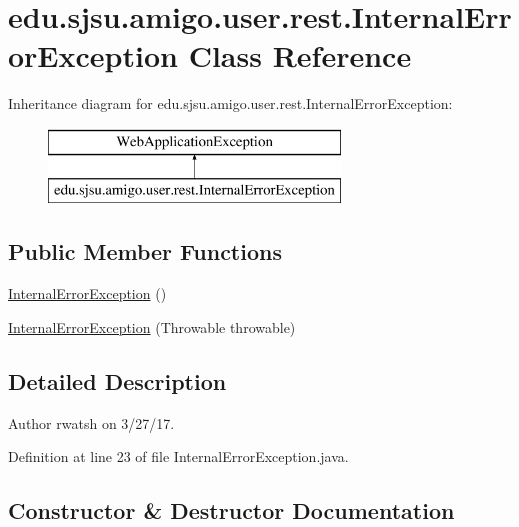 \hypertarget{classedu_1_1sjsu_1_1amigo_1_1user_1_1rest_1_1_internal_error_exception}{}\section{edu.\+sjsu.\+amigo.\+user.\+rest.\+Internal\+Error\+Exception Class Reference}
\label{classedu_1_1sjsu_1_1amigo_1_1user_1_1rest_1_1_internal_error_exception}
Inheritance diagram for edu.\+sjsu.\+amigo.\+user.\+rest.\+Internal\+Error\+Exception\+:\begin{figure}[H]
\begin{center}
\leavevmode
\includegraphics[height=2.000000cm]{classedu_1_1sjsu_1_1amigo_1_1user_1_1rest_1_1_internal_error_exception}
\end{center}
\end{figure}
\subsection*{Public Member Functions}
\begin{DoxyCompactItemize}
\item 
\hyperlink{classedu_1_1sjsu_1_1amigo_1_1user_1_1rest_1_1_internal_error_exception_ab92c4f82b13a36e0c18030251f81a7ab}{Internal\+Error\+Exception} ()
\item 
\hyperlink{classedu_1_1sjsu_1_1amigo_1_1user_1_1rest_1_1_internal_error_exception_a35c066e3f55d2d9a580e04169fdf116f}{Internal\+Error\+Exception} (Throwable throwable)
\end{DoxyCompactItemize}


\subsection{Detailed Description}
\begin{DoxyAuthor}{Author}
rwatsh on 3/27/17. 
\end{DoxyAuthor}


Definition at line 23 of file Internal\+Error\+Exception.\+java.



\subsection{Constructor \& Destructor Documentation}
\mbox{\label{classedu_1_1sjsu_1_1amigo_1_1user_1_1rest_1_1_internal_error_exception_ab92c4f82b13a36e0c18030251f81a7ab}} 
